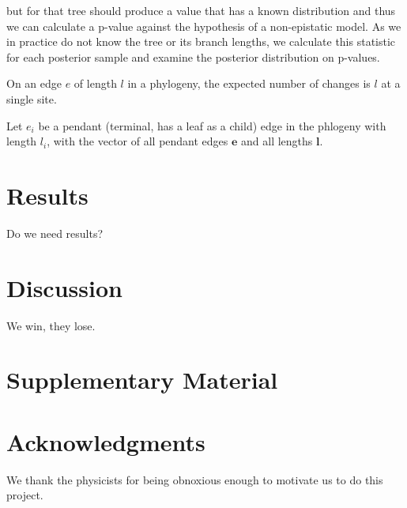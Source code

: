 \documentclass[11pt]{article}
\begin{document}



but for that tree should produce a value that has a known distribution and thus we can calculate a p-value against the hypothesis of a non-epistatic model.
As we in practice do not know the tree or its branch lengths, we calculate this statistic for each posterior sample and examine the posterior distribution on p-values.

On an edge $e$ of length $l$ in a phylogeny, the expected number of changes is $l$ at a single site.

Let $e_i$ be a pendant (terminal, has a leaf as a child) edge in the phlogeny with length $l_i$, with the vector of all pendant edges $\boldsymbol{e}$ and all lengths $\boldsymbol{l}$.



\section*{Results\label{sec:results}}

Do we need results?

\section*{Discussion\label{sec:discussion}}

We win, they lose.

\section*{Supplementary Material}



\section*{Acknowledgments}
We thank the physicists for being obnoxious enough to motivate us to do this project.



\end{document}
